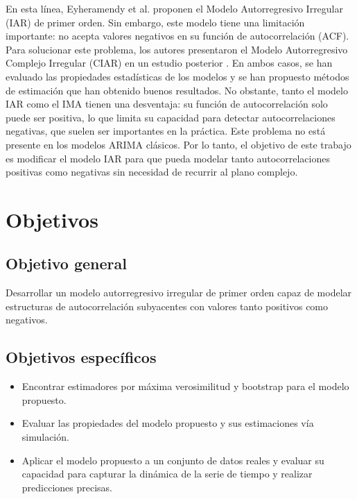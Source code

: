  
 

En esta línea, Eyheramendy et al. \cite{eyheramendy2018irregular} proponen el Modelo 
Autorregresivo Irregular (IAR) de primer orden. Sin embargo, este modelo tiene una limitación 
importante: no acepta valores negativos en su función de autocorrelación (ACF). Para solucionar 
este problema, los autores presentaron el Modelo Autorregresivo Complejo Irregular (CIAR) en un 
estudio posterior \citep{elorrieta2019discrete}. En ambos casos, se han evaluado las propiedades 
estadísticas de los modelos y se han propuesto métodos de estimación que han obtenido buenos 
resultados. No obstante, tanto el modelo IAR como el IMA tienen una desventaja: su función de 
autocorrelación solo puede ser positiva, lo que limita su capacidad para detectar 
autocorrelaciones negativas, que suelen ser importantes en la práctica. Este problema no está 
presente en los modelos ARIMA clásicos. Por lo tanto, el objetivo de este trabajo es 
modificar el modelo IAR para que pueda modelar tanto autocorrelaciones positivas como negativas 
sin necesidad de recurrir al plano complejo.
 
\section{Objetivos}
\subsection{Objetivo general}
Desarrollar un modelo autorregresivo irregular de primer orden capaz de 
modelar estructuras de autocorrelación subyacentes con valores tanto positivos como negativos.
\subsection{Objetivos específicos}
\begin{itemize}
    \item Encontrar estimadores por máxima verosimilitud y bootstrap para el modelo propuesto.
    \item Evaluar las propiedades del modelo propuesto y sus estimaciones vía simulación.
    \item Aplicar el modelo propuesto a un conjunto de datos reales y evaluar su capacidad para capturar la dinámica 
          de la serie de tiempo y realizar predicciones precisas.
\end{itemize}